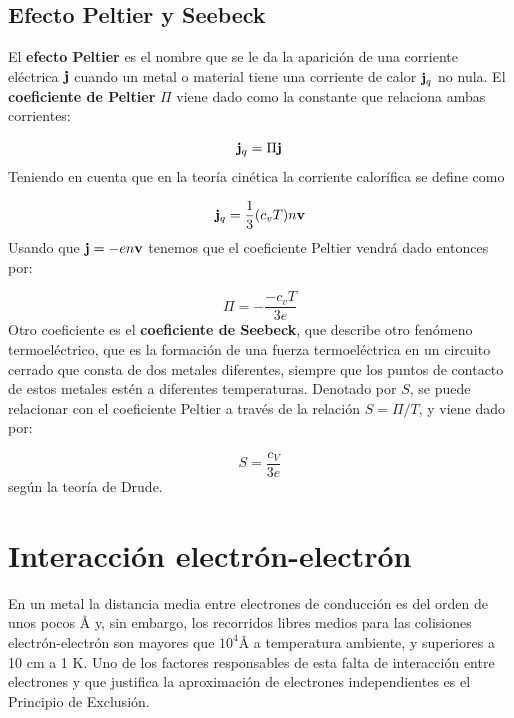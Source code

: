 \subsection{Efecto Peltier y Seebeck}

El \textbf{efecto Peltier} es el nombre que se le da la aparición de una corriente eléctrica $\mathbf{j}$ cuando un metal o material tiene una corriente de calor $\mathbf{j}_q$ no nula. El \textbf{coeficiente de Peltier} $\Pi$ viene dado como la constante que relaciona ambas corrientes:

\begin{equation}
	\mathbf{j}_q = \Pi \mathbf{j}
\end{equation}
Teniendo en cuenta que en la teoría cinética la corriente calorífica se define como

\begin{equation}
	\mathbf{j}_q = \frac{1}{3} (c_v T) n \mathbf{v}
\end{equation}
Usando que $\mathbf{j}=-en\mathbf{v}$ tenemos que el coeficiente Peltier vendrá dado entonces por:

\begin{equation}
	\Pi = - \frac{-c_v T}{3e}
\end{equation}
Otro coeficiente es el \textbf{coeficiente de Seebeck}, que describe otro fenómeno termoeléctrico, que es la formación de una fuerza termoeléctrica en un circuito cerrado que consta de dos metales diferentes, siempre que los puntos de contacto de estos metales estén a diferentes temperaturas. Denotado por $S$, se puede relacionar con el coeficiente Peltier a través de la relación $S=\Pi/T$, y viene dado por:

\begin{equation}
	S = \frac{c_V}{3e}
\end{equation}
según la teoría de Drude. 

\section{Interacción electrón-electrón}

En un metal la distancia media entre electrones de conducción es del orden de unos pocos $\unit{\angstrom}$ y, sin embargo, los recorridos libres medios para las colisiones electrón-electrón son mayores que $10^4 \unit{\angstrom}$ a temperatura ambiente, y superiores a 10 cm a 1 K. Uno de los factores responsables de esta falta de interacción entre electrones y que justifica la aproximación de electrones independientes es el Principio de Exclusión.

